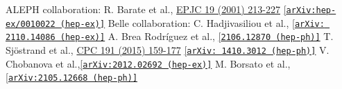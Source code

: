 \documentclass[a4paper,11pt]{article}
\begin{document}
\begin{thebibliography}{99}
ALEPH collaboration: R. Barate et al., \href{https://doi.org/10.1007/s100520100612}{EPJC 19 (2001) 213-227} \href{https://arxiv.org/abs/hep-ex/0010022}{[\tt arXiv:hep-ex/0010022 (hep-ex)]}
Belle collaboration: C. Hadjivasiliou et al., \href{https://arxiv.org/abs/2110.14086}{[\tt arXiv: 2110.14086 (hep-ex)]}
A. Brea Rodríguez et al., \href{https://arxiv.org/abs/2106.12870}{[\tt 2106.12870 (hep-ph)]}
T. Sj\"ostrand et al., \href{https://doi.org/10.1016/j.cpc.2015.01.024}{CPC 191 (2015) 159-177} \href{https://arxiv.org/abs/1410.3012}{[\tt arXiv: 1410.3012 (hep-ph)]}
V. Chobanova et al.,\href{https://arxiv.org/abs/2012.02692}{[\tt arXiv:2012.02692 (hep-ex)]}
M. Borsato et al., \href{https://arxiv.org/abs/2105.12668}{[\tt arXiv:2105.12668 (hep-ph)]}
\end{thebibliography}
\end{document}
